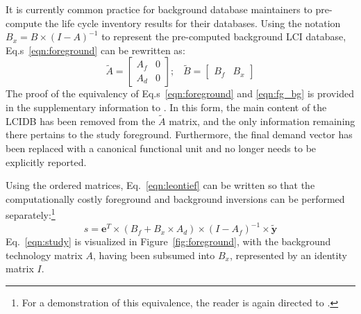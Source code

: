 It is currently common practice for background database maintainers to pre-compute the life cycle inventory results for their databases.  Using the notation $B_x = B \times (I - A)^{-1}$ to represent the pre-computed background LCI database, Eq.s~\ref{eqn:foreground} can be rewritten as:
\begin{equation}
 \tilde{A} = \left[\begin{array}{cc} 
A_f &  0 \\
A_d & 0 
   \end{array}\right];\;\;\;  \tilde{B} = \left[\begin{array}{cc} B_f & B_x \end{array}\right ]
\label{eqn:fg_bg}
\end{equation}
The proof of the equivalency of Eq.s~\ref{eqn:foreground} and \ref{eqn:fg_bg} is provided in the supplementary information to \cite{Kuczenski_JLCA_2015}.  In this form, the main content of the LCIDB has been removed from the $\tilde{A}$ matrix, and the only information remaining there pertains to the study foreground.  Furthermore, the final demand vector has been replaced with a canonical functional unit and no longer needs to be explicitly reported.

Using the ordered matrices, Eq.~\ref{eqn:leontief} can be written so that the computationally costly foreground and background inversions can be performed separately:\footnote{For a demonstration of this equivalence, the reader is again directed to \cite{Kuczenski_JLCA_2015}.}
\begin{equation}
s = \mathbf{e}^T \times (B_f + B_x\times A_d) \times (I - A_f)^{-1} \times \tilde{\mathbf{y}}
\label{eqn:study}
\end{equation}
Eq.~\ref{eqn:study} is visualized in Figure~\ref{fig:foreground}, with the background technology matrix $A$, having been subsumed into $B_x$, represented by an identity matrix $I$.  

